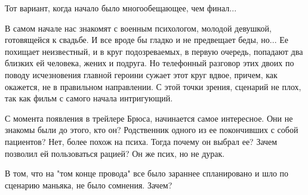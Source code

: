  
 
 
 
 

Тот вариант, когда начало было многообещающее, чем финал...

В самом начале нас знакомят с военным психологом, молодой девушкой, готовящейся
к свадьбе. И все вроде бы гладко и не предвещает беды, но... Ее похищает
неизвестный, и в круг подозреваемых, в первую очередь, попадают два близких ей
человека, жених и подруга. Но телефонный разговор этих двоих по поводу
исчезновения главной героини сужает этот круг вдвое, причем, как окажется, не в
правильном направлении. С этой точки зрения, сценарий не плох, так как фильм с
самого начала интригующий.

С момента появления в трейлере Брюса, начинается самое интересное. Они не
знакомы были до этого, кто он? Родственник одного из ее покончивших с собой
пациентов? Нет, более похож на психа. Тогда почему он выбрал ее? Зачем позволил
ей пользоваться рацией? Он же псих, но не дурак.

В том, что на "том конце провода" все было зараннее спланировано и шло по
сценарию маньяка, не было сомнения. Зачем?

